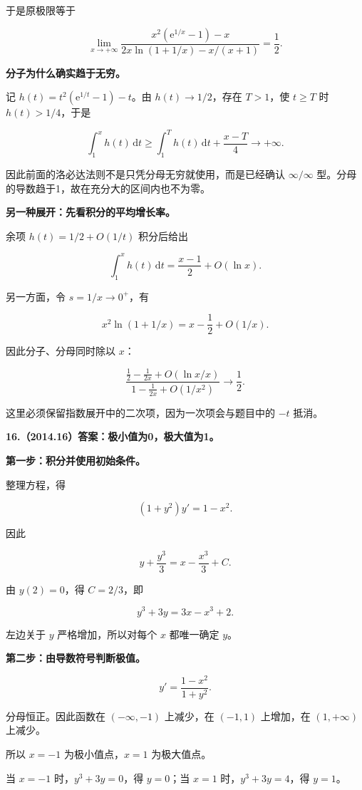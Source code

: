 \documentclass[UTF8,11pt,fontset=windows]{ctexart}
\begin{document}
于是原极限等于

$$
\lim_{x\to+\infty}
\frac{x^2(\mathrm e^{1/x}-1)-x}{2x\ln(1+1/x)-x/(x+1)}
=\frac12.
$$

\textbf{分子为什么确实趋于无穷。}

记 $h(t)=t^2(\mathrm e^{1/t}-1)-t$。由 $h(t)\to1/2$，存在 $T>1$，使 $t\ge T$ 时 $h(t)>1/4$，于是

$$
\int_1^xh(t)\,\mathrm dt
\ge\int_1^T h(t)\,\mathrm dt+\frac{x-T}{4}\to+\infty.
$$

因此前面的洛必达法则不是只凭分母无穷就使用，而是已经确认 $\infty/\infty$ 型。分母的导数趋于1，故在充分大的区间内也不为零。

\textbf{另一种展开：先看积分的平均增长率。}

余项 $h(t)=1/2+O(1/t)$ 积分后给出

$$
\int_1^x h(t)\,\mathrm dt=\frac{x-1}{2}+O(\ln x).
$$

另一方面，令 $s=1/x\to0^+$，有

$$
x^2\ln(1+1/x)=x-\frac12+O(1/x).
$$

因此分子、分母同时除以 $x$：

$$
\frac{\frac12-\frac1{2x}+O(\ln x/x)}
{1-\frac1{2x}+O(1/x^2)}\to\frac12.
$$

这里必须保留指数展开中的二次项，因为一次项会与题目中的 $-t$ 抵消。

\clearpage

\textbf{16.（2014.16）答案：极小值为0，极大值为1。}

\textbf{第一步：积分并使用初始条件。}

整理方程，得

$$
(1+y^2)y'=1-x^2.
$$

因此

$$
y+\frac{y^3}{3}=x-\frac{x^3}{3}+C.
$$

由 $y(2)=0$，得 $C=2/3$，即

$$
y^3+3y=3x-x^3+2.
$$

左边关于 $y$ 严格增加，所以对每个 $x$ 都唯一确定 $y$。

\textbf{第二步：由导数符号判断极值。}

$$
y'=\frac{1-x^2}{1+y^2}.
$$

分母恒正。因此函数在 $(-\infty,-1)$ 上减少，在 $(-1,1)$ 上增加，在 $(1,+\infty)$ 上减少。

所以 $x=-1$ 为极小值点，$x=1$ 为极大值点。

当 $x=-1$ 时，$y^3+3y=0$，得 $y=0$；当 $x=1$ 时，$y^3+3y=4$，得 $y=1$。
\end{document}
